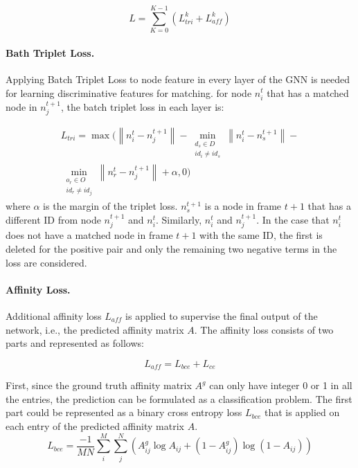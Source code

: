 \documentclass[10pt,twocolumn,letterpaper]{article}
\begin{document}
\begin{equation}
L = \sum^{K-1}_{K=0}(L^{k}_{tri} + L^{k}_{aff})
\end{equation}

\paragraph{Bath Triplet Loss.} Applying Batch Triplet Loss to node feature in every layer of the GNN is needed for learning discriminative features for matching. for node $n^{t}_{i}$ that has a matched node in $n^{t+1}_{j}$, the batch triplet loss in each layer is:

\begin{multline}
L_{tri} =  \max(\left\|n^{t}_{i} - n^{t+1}_{j}\right\| - \min_{\substack{\text{$d_{s}\in D$} \\ \text{$id_{i} \neq id_{s}$}}}
{\left\|n^{t}_{i} - n^{t+1}_{s}\right\|} -\\ \min_{\substack{\text{$o_{r} \in O$} \\ \text{$id_{r} \neq id_{j}$}}}{\left\| n^{t}_{r} - n^{t+1}_{j}\right\|}+ \alpha, 0)
\end{multline}
where $\alpha$ is the margin of the triplet loss. $n^{t+1}_{s}$ is a node in frame $t+1$ that has a different ID from node $n^{t+1}_{j}$ and $n^{t}_{i}$. Similarly, $n^{t}_{i}$ and $n^{t+1}_{j}$. In the case that $n^{t}_{i}$ does not have a matched node in frame $t+1$ with the same ID,  the first is deleted for the positive pair and only the remaining two negative terms in the loss are considered.

\paragraph{Affinity Loss.} Additional affinity loss $L_{aff}$ is applied to supervise the final output of the network, i.e., the predicted affinity matrix $A$. The affinity loss consists of two parts and represented as follows: 

\begin{equation}
L_{aff} = L_{bce} + L_{ce}
\end{equation}

First, since the ground truth affinity matrix $A^{g}$ can only have integer 0 or 1 in all the entries, the prediction can be formulated as a classification problem. The first part could be represented as a binary cross entropy loss $L_{bce}$ that is applied on each entry of the predicted affinity matrix $A$.
\begin{equation}
L_{bce} = \frac{-1}{MN}\sum^{M}_{i}\sum^{N}_{j}(A^{g}_{ij} \log A_{ij} +(1-A^{g}_{ij})\log(1-A_{ij}))
\end{equation}
\end{document}
